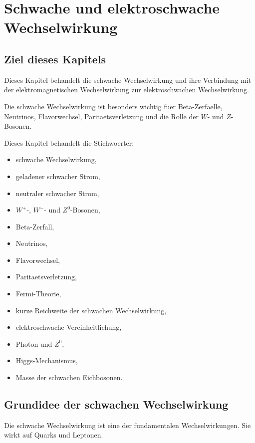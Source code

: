 \chapter{Schwache und elektroschwache Wechselwirkung}

\section{Ziel dieses Kapitels}

Dieses Kapitel behandelt die schwache Wechselwirkung und ihre Verbindung mit der
elektromagnetischen Wechselwirkung zur elektroschwachen Wechselwirkung.

Die schwache Wechselwirkung ist besonders wichtig fuer Beta-Zerfaelle, Neutrinos,
Flavorwechsel, Paritaetsverletzung und die Rolle der $W$- und $Z$-Bosonen.

\begin{notebox}
Dieses Kapitel behandelt die Stichwoerter:
\begin{itemize}
    \item schwache Wechselwirkung,
    \item geladener schwacher Strom,
    \item neutraler schwacher Strom,
    \item $W^+$-, $W^-$- und $Z^0$-Bosonen,
    \item Beta-Zerfall,
    \item Neutrinos,
    \item Flavorwechsel,
    \item Paritaetsverletzung,
    \item Fermi-Theorie,
    \item kurze Reichweite der schwachen Wechselwirkung,
    \item elektroschwache Vereinheitlichung,
    \item Photon und $Z^0$,
    \item Higgs-Mechanismus,
    \item Masse der schwachen Eichbosonen.
\end{itemize}
\end{notebox}

\section{Grundidee der schwachen Wechselwirkung}

Die schwache Wechselwirkung ist eine der fundamentalen Wechselwirkungen.
Sie wirkt auf Quarks und Leptonen.

